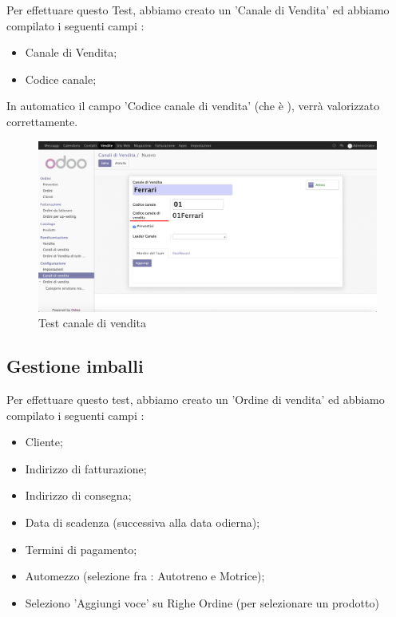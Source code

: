 \vspace*{0.5cm}
Per effettuare questo Test, abbiamo creato un 'Canale di Vendita' ed abbiamo compilato i seguenti campi :
\begin{itemize}
\item Canale di Vendita;
\item Codice canale;
\end{itemize}
\newpage
In automatico il campo 'Codice canale di vendita' (che è ), verrà valorizzato correttamente.
  
\begin{figure}[H]
	\begin{center} \includegraphics[scale=0.3]{figures/fourth_test}
		\caption[Test canale di vendita]{Test canale di vendita}
		\label{fig:fourth_test}
	\end{center}
\end{figure}


\subsection{Gestione imballi}

Per effettuare questo test, abbiamo creato un 'Ordine di vendita' ed abbiamo compilato i seguenti campi :
\begin{itemize}
	\item Cliente;
	\item Indirizzo di fatturazione;
	\item Indirizzo di consegna;
	\item Data di scadenza (successiva alla data odierna);
	\item Termini di pagamento;
	\item Automezzo (selezione fra : Autotreno e Motrice);
	\item Seleziono 'Aggiungi voce' su Righe Ordine (per selezionare un prodotto)
\end{itemize}

